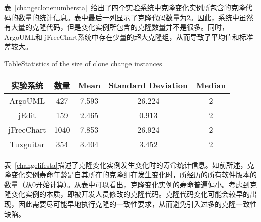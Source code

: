 表~\ref{changeclonenumbersta}~给出了四个实验系统中克隆变化实例所包含的克隆代码的数量的统计信息。表中最后一列显示了克隆代码数量为2。因此，系统中虽然有大量的克隆代码，但是变化实例所包含的克隆数量并不是很多。同时，ArgoUML和 jFreeChart系统中存在少量的超大克隆组，从而导致了平均值和标准差较大。

\begin{table}[htbp]
{Table$\!$}{Statistics of the size of clone change instances}
\vspace{0.5em}
\centering
\wuhao
\begin{tabular}{ccccc}
\toprule[1.5pt]
{实验系统}&{数量}&{Mean}&{Standard Deviation}&{Median}\\ 
\midrule[1pt]
ArgoUML&427&7.593&	26.224&2\\
jEdit&159&	2.465&	0.913&2\\ 
jFreeChart&1040&	7.853&	26.924&2\\
Tuxguitar&354&	3.404	&3.452&2\\ 
\bottomrule[1.5pt]
\end{tabular}
\end{table}


表~\ref{changelifesta}描述了克隆变化实例发生变化时的寿命统计信息。如前所述，克隆变化实例寿命年龄是自其所在的克隆组在发生变化时，所经历的所有软件版本的数量（从$0$开始计算）。从表中可以看出，克隆变化实例的寿命普遍偏小。考虑到克隆变化实例的本质，即被开发人员修改的克隆代码。克隆代码变化可能会较早的出现，因此需要尽可能早地执行克隆的一致性要求，从而避免引入过多的克隆一致性缺陷。

